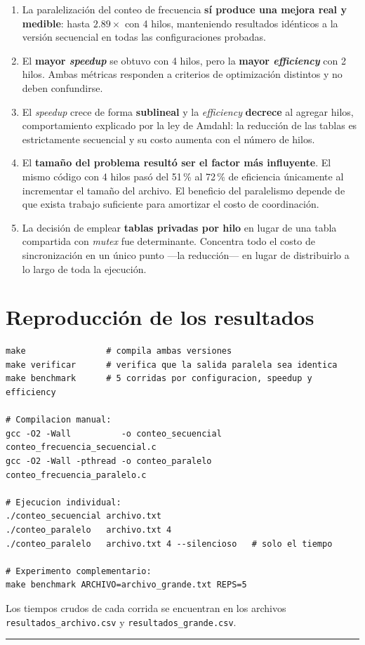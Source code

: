 \documentclass[11pt,letterpaper]{article}
\begin{document}
\begin{enumerate}[label=\textbf{\arabic*.}]
  \item La paralelización del conteo de frecuencia \textbf{sí produce una mejora
        real y medible}: hasta $2.89\times$ con 4 hilos, manteniendo resultados
        idénticos a la versión secuencial en todas las configuraciones probadas.
  \item El \textbf{mayor \emph{speedup}} se obtuvo con 4 hilos, pero la
        \textbf{mayor \emph{efficiency}} con 2 hilos. Ambas métricas responden a
        criterios de optimización distintos y no deben confundirse.
  \item El \emph{speedup} crece de forma \textbf{sublineal} y la \emph{efficiency}
        \textbf{decrece} al agregar hilos, comportamiento explicado por la ley de
        Amdahl: la reducción de las tablas es estrictamente secuencial y su costo
        aumenta con el número de hilos.
  \item El \textbf{tamaño del problema resultó ser el factor más influyente}. El
        mismo código con 4 hilos pasó del 51\,\% al 72\,\% de eficiencia
        únicamente al incrementar el tamaño del archivo. El beneficio del
        paralelismo depende de que exista trabajo suficiente para amortizar el
        costo de coordinación.
  \item La decisión de emplear \textbf{tablas privadas por hilo} en lugar de una
        tabla compartida con \emph{mutex} fue determinante. Concentra todo el
        costo de sincronización en un único punto —la reducción— en lugar de
        distribuirlo a lo largo de toda la ejecución.
\end{enumerate}

\section{Reproducción de los resultados}

\begin{lstlisting}[style=sh,caption={Comandos para reproducir el experimento}]
make                # compila ambas versiones
make verificar      # verifica que la salida paralela sea identica
make benchmark      # 5 corridas por configuracion, speedup y efficiency

# Compilacion manual:
gcc -O2 -Wall          -o conteo_secuencial conteo_frecuencia_secuencial.c
gcc -O2 -Wall -pthread -o conteo_paralelo   conteo_frecuencia_paralelo.c

# Ejecucion individual:
./conteo_secuencial archivo.txt
./conteo_paralelo   archivo.txt 4
./conteo_paralelo   archivo.txt 4 --silencioso   # solo el tiempo

# Experimento complementario:
make benchmark ARCHIVO=archivo_grande.txt REPS=5
\end{lstlisting}

\noindent
Los tiempos crudos de cada corrida se encuentran en los archivos
\texttt{resultados\_archivo.csv} y \texttt{resultados\_grande.csv}.

\vfill
\begin{center}
\color{grisln}\rule{0.5\linewidth}{0.6pt}
\end{center}
\end{document}
